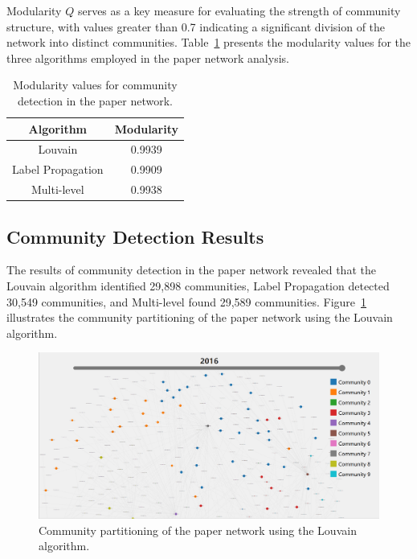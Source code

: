 \documentclass[11pt]{article}
\begin{document}
Modularity \( Q \) serves as a key measure for evaluating the strength of community structure, with values greater than 0.7 indicating a significant division of the network into distinct communities. Table~\ref{tab:modularity_values} presents the modularity values for the three algorithms employed in the paper network analysis.

\begin{table}[h!]
    \centering
    \begin{tabular}{|c|c|}
    \hline
    \textbf{Algorithm} & \textbf{Modularity} \\ \hline
    Louvain            & 0.9939             \\ \hline
    Label Propagation  & 0.9909             \\ \hline
    Multi-level        & 0.9938             \\ \hline
    \end{tabular}
    \caption{Modularity values for community detection in the paper network.}
    \label{tab:modularity_values}
\end{table}

\subsection{Community Detection Results}

The results of community detection in the paper network revealed that the Louvain algorithm identified 29,898 communities, Label Propagation detected 30,549 communities, and Multi-level found 29,589 communities. Figure~\ref{fig:community_partitioning} illustrates the community partitioning of the paper network using the Louvain algorithm.

\begin{figure}[h!]
    \centering
    \includegraphics[width=\linewidth]{img/community.jpg}
    \caption{Community partitioning of the paper network using the Louvain algorithm.}
    \label{fig:community_partitioning}
\end{figure}
\end{document}
